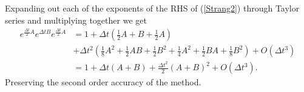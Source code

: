 \FloatBarrier
%
Expanding out each of the exponents of the RHS of (\ref{Strang2}) through Taylor series and multiplying together we get
%
\begin{align*}
e^{\frac{\Delta t}{2} A} e^{\Delta t B} e^{\frac{\Delta t}{2} A} &= 1 + \Delta t \left(\frac{1}{2} A + B + \frac{1}{2} A\right)\\
&+ \Delta t^2 \left(\frac{1}{8} A^2 + \frac{1}{2} A B + \frac{1}{2} B^2 + \frac{1}{4} A^2 + \frac{1}{2} B A + \frac{1}{8} B^2 \right) + O(\Delta t^3)\\
&= 1 + \Delta t (A + B) + \frac{\Delta t^2}{2}(A + B)^2 + O(\Delta t^3).
\end{align*}
%
Preserving the second order accuracy of the method.
